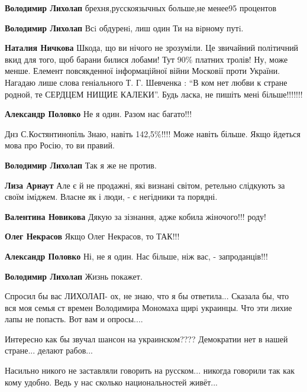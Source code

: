 \begin{itemize}
{\begin{itemize}
\textbf{Володимир Лихолап} брехня,русскоязычных больше,не менее95 процентов

\textbf{Володимир Лихолап} Всi обдуренi, лиш один Ти на вiрному путi.

\textbf{Наталия Ничкова} Шкода, що ви нічого не зрозуміли. Це звичайний політичний вкид
для того, щоб барани билися лобами! Тут 90\% платних тролів! Ну, може менше.
Елемент повсякденної інформаційної війни Московії проти України. Нагадаю лише
слова геніального Т. Г. Шевченка : \enquote{В ком нет любви к стране родной, те СЕРДЦЕМ
НИЩИЕ КАЛЕКИ}. Будь ласка, не пишіть мені більше!!!!!!!

\textbf{Александр Половко} Не я один. Разом нас багато!!!


Днз С.Костянтинопіль Знаю, навіть 142,5\%!!!! Може навіть більше. Якщо йдеться мова про Росію, то ви правий.

\textbf{Володимир Лихолап} Так я же не против.

\textbf{Лиза Арнаут} Але є й не продажні, які визнані світом, ретельно слідкують за своїм іміджем. Власне як і люди, - є негідники та порядні.

\textbf{Валентина Новикова} Дякую за зізнання, адже кобила жіночого!!! роду!

\textbf{Олег Некрасов} Якщо Олег Некрасов, то ТАК!!!

\textbf{Александр Половко} Ні, не я один. Нас більше, ніж вас, - запроданців!!!

\textbf{Володимир Лихолап} Жизнь покажет.

Спросил бы вас ЛИХОЛАП- ох, не знаю, что я бы ответила... Сказала бы, что вся моя семья ст времен Володимира Мономаха щирi украинцы. Что эти лихие лапы не попасть. Вот вам и опросы....


\end{itemize}


Интересно как бы звучал шансон на украинском???? Демократии нет в нашей
стране... делают рабов...


Насильно никого не заставляли говорить на русском... никогда говорили так как
кому удобно. Ведь у нас сколько национальностей живёт...

}
\end{itemize}
